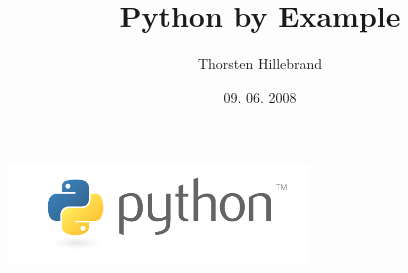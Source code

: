 \documentclass[10pt]{beamer}
\title{Python by Example}
\date{}
\author{Thorsten Hillebrand}
\date{09. 06. 2008}
\institute{HAW Hamburg}
\begin{document}
\begin{frame}
\titlepage

 \begin{center}
  \includegraphics[width=80mm]{python-logo.png}
 \end{center}

\end{frame}

\begin{frame}
 \tableofcontents[circle]
\end{frame}
\end{document}
